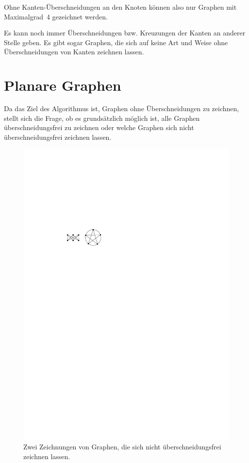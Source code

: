 \documentclass[a4paper]{scrreprt}
\theoremstyle{definition}
\begin{document}
Ohne Kanten-Überschneidungen an den Knoten können also nur Graphen mit Maximalgrad~4 gezeichnet werden. 

Es kann noch immer Überschneidungen bzw. Kreuzungen der Kanten an anderer Stelle geben. Es gibt sogar Graphen, die sich auf keine Art und Weise ohne Überschneidungen von Kanten zeichnen lassen.


\section{Planare Graphen}

Da das Ziel des Algorithmus ist, Graphen ohne Überschneidungen zu zeichnen, stellt sich die Frage, ob es grundsätzlich möglich ist, alle Graphen überschneidungsfrei zu zeichnen oder welche Graphen sich nicht überschneidungsfrei zeichnen lassen.

\begin{figure}[h]
  \centering
  \includegraphics{nonplanar}
  \caption{Zwei Zeichnungen von Graphen, die sich nicht überschneidungsfrei zeichnen lassen.}
  \label{fig:nonplanar}
\end{figure}
\end{document}
